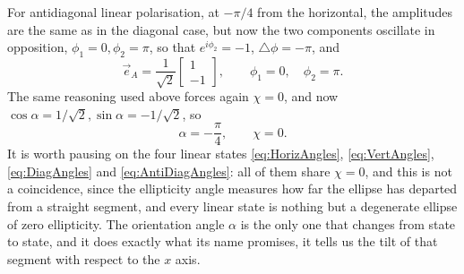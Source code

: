             For antidiagonal linear polarisation, at $-\pi/4$ from the horizontal, the amplitudes are the same as in the diagonal case, but now the two components oscillate in opposition, $\phi_1=0,\phi_2=\pi$, so that $e^{i\phi_2}=-1$, $\triangle\phi=-\pi$, and
            \begin{equation}\label{eq:JonesAntiDiag}
                \vec{e}_{A} = \frac{1}{\sqrt{2}}\begin{bmatrix}1\\-1\end{bmatrix}, \qquad \phi_1=0,\quad\phi_2=\pi.
            \end{equation}
            The same reasoning used above forces again $\chi=0$, and now $\cos\alpha=1/\sqrt2,\sin\alpha=-1/\sqrt2$, so
            \begin{equation}\label{eq:AntiDiagAngles}
                \boxed{\alpha=-\frac{\pi}{4},\qquad \chi=0}.
            \end{equation}
            It is worth pausing on the four linear states \ref{eq:HorizAngles}, \ref{eq:VertAngles}, \ref{eq:DiagAngles} and \ref{eq:AntiDiagAngles}: all of them share $\chi=0$, and this is not a coincidence, since the ellipticity angle measures how far the ellipse has departed from a straight segment, and every linear state is nothing but a degenerate ellipse of zero ellipticity. The orientation angle $\alpha$ is the only one that changes from state to state, and it does exactly what its name promises, it tells us the tilt of that segment with respect to the $x$ axis.

